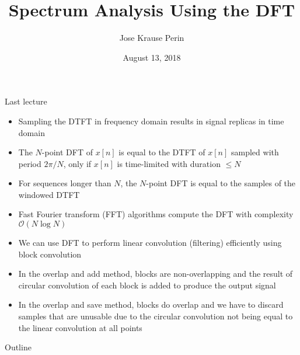 \documentclass[10pt, aspectratio=169, handout]{beamer}
\title[EE 264]{Spectrum Analysis Using the DFT}
\author{Jose Krause Perin}
\institute{Stanford University}
\date{August 13, 2018}
\begin{document}
\begin{frame}
  \titlepage
\end{frame}

%
\begin{frame}{Last lecture}
\begin{itemize}
	\item Sampling the DTFT in frequency domain results in signal replicas in time domain
	\item The $N$-point DFT of $x[n]$ is equal to the DTFT of $x[n]$ sampled with period $2\pi/N$, only if $x[n]$ is time-limited with duration $\leq N$
	\item For sequences longer than $N$, the $N$-point DFT is equal to the samples of the windowed DTFT
	\item Fast Fourier transform (FFT) algorithms compute the DFT with complexity $\mathcal{O}(N\log N)$
	\item We can use DFT to perform linear convolution (filtering) efficiently using block convolution
	\item In the overlap and add method, blocks are non-overlapping and the result of circular convolution of each block is added to produce the output signal
	\item In the overlap and save method, blocks do overlap and we have to discard samples that are unusable due to the circular convolution not being equal to the linear convolution at all points
\end{itemize}
\end{frame}

%
\begin{frame}{Outline}
	\tableofcontents
\end{frame}

%
\end{document}
